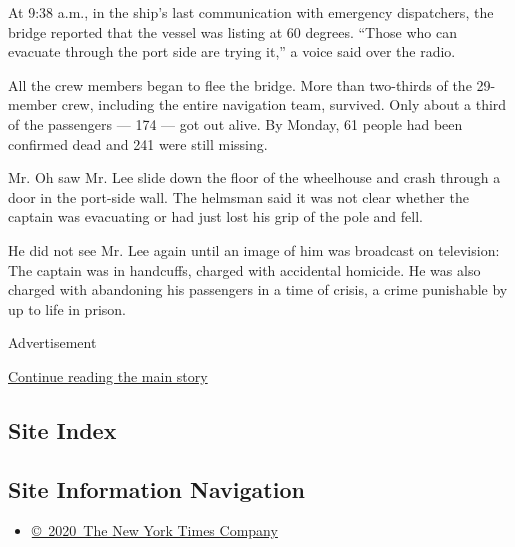 At 9:38 a.m., in the ship's last communication with emergency
dispatchers, the bridge reported that the vessel was listing at 60
degrees. ``Those who can evacuate through the port side are trying it,''
a voice said over the radio.

All the crew members began to flee the bridge. More than two-thirds of
the 29-member crew, including the entire navigation team, survived. Only
about a third of the passengers --- 174 --- got out alive. By Monday, 61
people had been confirmed dead and 241 were still missing.

Mr. Oh saw Mr. Lee slide down the floor of the wheelhouse and crash
through a door in the port-side wall. The helmsman said it was not clear
whether the captain was evacuating or had just lost his grip of the pole
and fell.

He did not see Mr. Lee again until an image of him was broadcast on
television: The captain was in handcuffs, charged with accidental
homicide. He was also charged with abandoning his passengers in a time
of crisis, a crime punishable by up to life in prison.

Advertisement

\protect\hyperlink{after-bottom}{Continue reading the main story}

\hypertarget{site-index}{%
\subsection{Site Index}\label{site-index}}

\hypertarget{site-information-navigation}{%
\subsection{Site Information
Navigation}\label{site-information-navigation}}

\begin{itemize}
\tightlist
\item
  \href{https://help.nytimes.com/hc/en-us/articles/115014792127-Copyright-notice}{©~2020~The
  New York Times Company}
\end{itemize}


